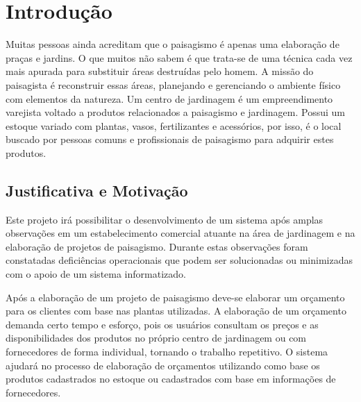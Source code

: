 \chapter{Introdução}
Muitas pessoas ainda acreditam que o paisagismo é apenas uma elaboração de praças e jardins. O que muitos não sabem é que trata-se de uma técnica cada vez mais apurada para substituir áreas destruídas pelo homem. A missão do paisagista é reconstruir essas áreas, planejando e gerenciando o ambiente físico com elementos da natureza. Um centro de jardinagem é um empreendimento varejista voltado a produtos relacionados a paisagismo e jardinagem. Possui um estoque variado com plantas, vasos, fertilizantes e acessórios, por isso, é o local buscado por pessoas comuns e profissionais de paisagismo para adquirir estes produtos. %

\section{Justificativa e Motivação}

    Este projeto irá possibilitar o desenvolvimento de um sistema após amplas observações em um estabelecimento comercial atuante na área de jardinagem e na elaboração de projetos de paisagismo. Durante estas observações foram constatadas deficiências operacionais que podem ser solucionadas ou minimizadas com o apoio de um sistema informatizado.
    
 Após a elaboração de um projeto de paisagismo deve-se elaborar um orçamento para os clientes com base nas plantas utilizadas. A elaboração de um orçamento demanda certo tempo e esforço, pois os usuários consultam os preços e as disponibilidades dos produtos no próprio centro de jardinagem ou com fornecedores de forma individual, tornando o trabalho repetitivo. 
    O sistema ajudará no processo de elaboração de orçamentos utilizando como base os produtos cadastrados no estoque ou cadastrados com base em informações de fornecedores. 


